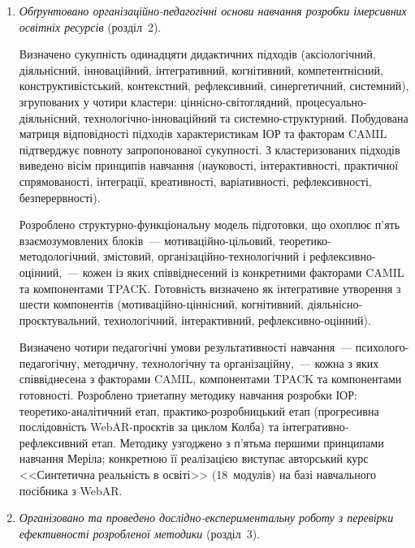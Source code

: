 \begin{enumerate}
Порівняльний аналіз ОПП 38~закладів вищої освіти за запропонованою моделлю рівнів зрілості інтеграції ІОР показав, що абсолютна більшість перебуває на рівнях~0--2, тоді як рівні~3--4 представлені одиничними випадками. Дослідницька траєкторія КДПУ (2020--2024) є єдиним задокументованим вітчизняним прикладом системного просування від рівня~2 до рівня~3--4.

\item \textit{Обґрунтовано організаційно-педагогічні основи навчання розробки імерсивних освітніх ресурсів} (розділ~2).

Визначено сукупність одинадцяти дидактичних підходів (аксіологічний, діяльнісний, інноваційний, інтегративний, когнітивний, компетентнісний, конструктивістський, контекстний, рефлексивний, синергетичний, системний), згрупованих у чотири кластери: ціннісно-світоглядний, процесуально-діяльнісний, технологічно-інноваційний та системно-структурний. Побудована матриця відповідності підходів характеристикам ІОР та факторам CAMIL підтверджує повноту запропонованої сукупності. З кластеризованих підходів виведено вісім принципів навчання (науковості, інтерактивності, практичної спрямованості, інтеграції, креативності, варіативності, рефлексивності, безперервності).

Розроблено структурно-функціональну модель підготовки, що охоплює п'ять взаємозумовлених блоків~--- мотиваційно-цільовий, теоретико-методологічний, змістовий, організаційно-технологічний і рефлексивно-оцінний,~--- кожен із яких співвіднесений із конкретними факторами CAMIL та компонентами TPACK. Готовність визначено як інтегративне утворення з шести компонентів (мотиваційно-ціннісний, когнітивний, діяльнісно-проєктувальний, технологічний, інтерактивний, рефлексивно-оцінний).

Визначено чотири педагогічні умови результативності навчання~--- психолого-педагогічну, методичну, технологічну та організаційну,~--- кожна з яких співвіднесена з факторами CAMIL, компонентами TPACK та компонентами готовності. Розроблено триетапну методику навчання розробки ІОР: теоретико-аналітичний етап, практико-розробницький етап (прогресивна послідовність WebAR-проєктів за циклом Колба) та інтегративно-рефлексивний етап. Методику узгоджено з п'ятьма першими принципами навчання Меріла; конкретною її реалізацією виступає авторський курс <<Синтетична реальність в освіті>> (18~модулів) на базі навчального посібника з WebAR.

\item \textit{Організовано та проведено дослідно-експериментальну роботу з перевірки ефективності розробленої методики} (розділ~3).


\end{enumerate}
